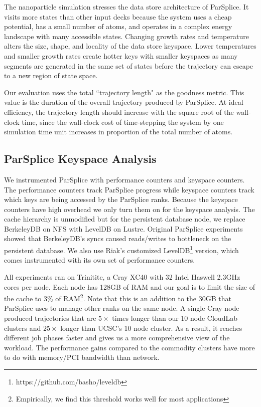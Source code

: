 The nanoparticle simulation stresses the data store architecture of ParSplice.
It visits more states than other input decks because the system uses a cheap
potential, has a small number of atoms, and operates in a complex energy
landscape with many accessible states. Changing growth rates and temperature
alters the size, shape, and locality of the data store keyspace. Lower
temperatures and smaller growth rates create hotter keys with smaller keyspaces
as many segments are generated in the same set of states before the trajectory
can escape to a new region of state space.

Our evaluation uses the total ``trajectory length" as the goodness metric. This
value is the duration of the overall trajectory produced by ParSplice. At
ideal efficiency, the trajectory length should increase with the square root of
the wall-clock time, since the wall-clock cost of time-stepping the system by
one simulation time unit increases in proportion of the total number of atoms.

\subsection{ParSplice Keyspace Analysis}
\label{sec:parsplice-keyspace-analysis}

We instrumented ParSplice with performance counters and keyspace counters.  The
performance counters track ParSplice progress while keyspace counters track
which keys are being accessed by the ParSplice ranks. Because the keyspace
counters have high overhead we only turn them on for the keyspace analysis.
The cache hierarchy is unmodified but for the persistent database node, we
replace BerkeleyDB on NFS with LevelDB on Lustre. Original ParSplice
experiments showed that BerkeleyDB's syncs caused reads/writes to bottleneck on
the persistent database. We also use Riak's customized
LevelDB\footnote{https://github.com/basho/leveldb} version, which comes
instrumented with its own set of performance counters.

All experiments ran on Trinitite, a Cray XC40 with 32 Intel Haswell 2.3GHz
cores per node.  Each node has 128GB of RAM and our goal is to limit the size
of the cache to 3\% of RAM\footnote{Empirically, we find this threshold works
well for most applications}. Note that this is an addition to the 30GB that
ParSplice uses to manage other ranks on the same node.  A single Cray node
produced trajectories that are \(5\times\) times longer than our 10 node
CloudLab clusters and \(25\times\) longer than UCSC's 10 node cluster. As a
result, it reaches different job phases faster and gives us a more
comprehensive view of the workload. The performance gains compared to the
commodity clusters have more to do with memory/PCI bandwidth than network.

